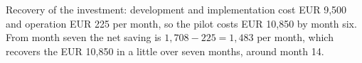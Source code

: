 \documentclass[letterpaper,11pt]{article}
\begin{document}
Recovery of the investment: development and implementation cost EUR 9,500 and operation EUR 225 per month, so the pilot costs EUR 10,850 by month six. From month seven the net saving is $1{,}708 - 225 = 1{,}483$ per month, which recovers the EUR 10,850 in a little over seven months, around month 14.
\end{document}
